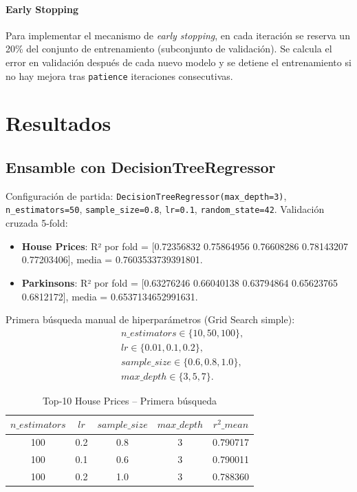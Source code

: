 \documentclass[conference,a4paper]{IEEEtran}
\begin{document}
\paragraph{Early Stopping} 
Para implementar el mecanismo de \emph{early stopping}, en cada iteración se reserva un 20\% del conjunto de entrenamiento (subconjunto de validación). Se calcula el error en validación después de cada nuevo modelo y se detiene el entrenamiento si no hay mejora tras \texttt{patience} iteraciones consecutivas.

\section{Resultados}
\subsection{Ensamble con DecisionTreeRegressor}
Configuración de partida: \texttt{DecisionTreeRegressor(max\_depth=3)}, \texttt{n\_estimators=50}, \texttt{sample\_size=0.8}, \texttt{lr=0.1}, \texttt{random\_state=42}. Validación cruzada 5-fold:
\begin{itemize}
    \item \textbf{House Prices}: R² por fold = [0.72356832 0.75864956 0.76608286 0.78143207 0.77203406], media = 0.7603533739391801.
    \item \textbf{Parkinsons}: R² por fold = [0.63276246 0.66040138 0.63794864 0.65623765 0.6812172], media = 0.6537134652991631.
\end{itemize}

Primera búsqueda manual de hiperparámetros (Grid Search simple):
\[
\begin{aligned}
& n\_estimators \in \{10, 50, 100\}, \\
& lr \in \{0.01, 0.1, 0.2\}, \\
& sample\_size \in \{0.6, 0.8, 1.0\}, \\
& max\_depth \in \{3, 5, 7\}.
\end{aligned}
\]
\begin{table}[h]
\centering
\caption{Top-10 House Prices – Primera búsqueda}
\begin{tabular}{|c|c|c|c|c|}
\hline
$n\_estimators$ & $lr$ & $sample\_size$ & $max\_depth$ & $r^2\_mean$ \\
\hline
100 & 0.2 & 0.8 & 3 & 0.790717 \\
100 & 0.1 & 0.6 & 3 & 0.790011 \\
100 & 0.2 & 1.0 & 3 & 0.788360 \\
\hline
\end{tabular}
\end{table}
\end{document}
